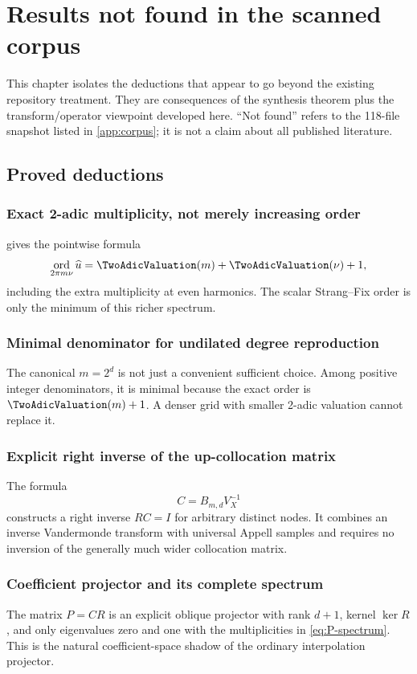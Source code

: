\documentclass[11pt,oneside]{book}
\newcommand{\CorpusCount}{118}%
\theoremstyle{definition}
\theoremstyle{remark}
\DeclareMathOperator{\ord}{ord}
\begin{document}
\chapter{Results not found in the scanned corpus}
\label{ch:new-results}

This chapter isolates the deductions that appear to go beyond the existing repository treatment.  They are consequences of the synthesis theorem plus the transform/operator viewpoint developed here.  ``Not found'' refers to the \CorpusCount-file snapshot listed in \cref{app:corpus}; it is not a claim about all published literature.

\section{Proved deductions}
\subsection{Exact 2-adic multiplicity, not merely increasing order}
 gives the pointwise formula
\[
 \ord_{2\pi m\nu}\widehat u=\TwoAdicValuation(m)+\TwoAdicValuation(\nu)+1,
\]
including the extra multiplicity at even harmonics.  The scalar Strang--Fix order is only the minimum of this richer spectrum.

\subsection{Minimal denominator for undilated degree reproduction}
The canonical \(m=2^d\) is not just a convenient sufficient choice.  Among positive integer denominators, it is minimal because the exact order is \(\TwoAdicValuation(m)+1\).  A denser grid with smaller 2-adic valuation cannot replace it.

\subsection{Explicit right inverse of the up-collocation matrix}
The formula
\[
 C=B_{m,d}V_X^{-1}
\]
constructs a right inverse \(RC=I\) for arbitrary distinct nodes.  It combines an inverse Vandermonde transform with universal Appell samples and requires no inversion of the generally much wider collocation matrix.

\subsection{Coefficient projector and its complete spectrum}
The matrix \(P=CR\) is an explicit oblique projector with rank \(d+1\), kernel \(\ker R\), and only eigenvalues zero and one with the multiplicities in \cref{eq:P-spectrum}.  This is the natural coefficient-space shadow of the ordinary interpolation projector.
\end{document}
